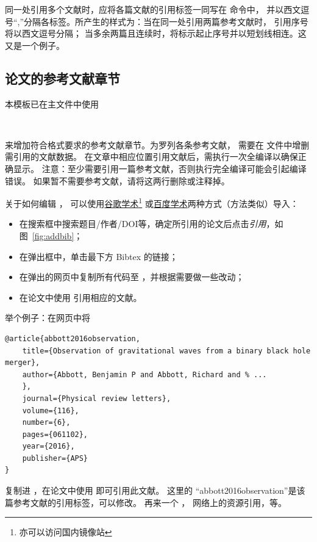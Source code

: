 同一处引用多个文献时，应将各篇文献的引用标签一同写在  命令中，
并以西文逗号“,”分隔各标签。所产生的样式为：当在同一处引用两篇参考文献时，
引用序号将以西文逗号分隔；
当多余两篇且连续时，将标示起止序号并以短划线相连。这\cite{texbook,latexrumen}
又是\cite{texbook,latexrumen,gbt7714-2005}一个例子。\cite{abbott2016observation,texbook,latexrumen,buctthesis}


\subsection{论文的参考文献章节}
本模板已在主文件中使用
\begin{lstlisting}[numbers=none]


	\end{lstlisting}
来增加符合格式要求的参考文献章节。为罗列各条参考文献，
需要在  文件中增删需引用的文献数据。
在文章中相应位置引用文献后，需执行一次全编译以确保正确显示。
注意：至少需要引用一篇参考文献，否则执行完全编译可能会引起编译错误。
如果暂不需要参考文献，请将这两行删除或注释掉。

关于如何编辑 ，
可以使用\href{http://scholar.google.com.cn/}{谷歌学术}\footnote{亦可以访问国内镜像站}%
或\href{http://xueshu.baidu.com}{百度学术}两种方式（方法类似）导入\BibTeX{}：
\begin{itemize}
	\item 在搜索框中搜索题目/作者/DOI等，确定所引用的论文后点击\emph{引用}，如图~\ref{fig:addbib}；
	\item 在弹出框中，单击最下方 Bibtex 的链接；
	\item 在弹出的网页中复制所有代码至 ，并根据需要做一些改动；
	\item 在论文中使用 引用相应的文献。
\end{itemize}

举个例子：在网页中将
\begin{lstlisting}
@article{abbott2016observation,
	title={Observation of gravitational waves from a binary black hole merger},
	author={Abbott, Benjamin P and Abbott, Richard and % ...
	},
	journal={Physical review letters},
	volume={116},
	number={6},
	pages={061102},
	year={2016},
	publisher={APS}
}
	\end{lstlisting}
复制进 ，在论文中使用
即可引用此文献。
这里的 “abbott2016observation”是该篇参考文献的引用标签，可以修改。
再来一个\cite{ashirov2008tetramerization} ，
网络上的资源引用\cite{buctthesis}，等。


